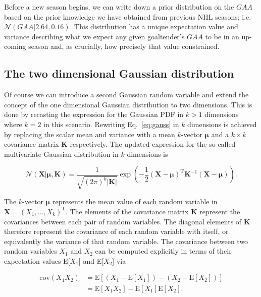 Before a new season begins, we can write down a prior distribution on the $GAA$
based on the prior knowledge we have obtained from previous NHL seasons; i.e.
$\mathcal{N}(GAA|2.64,0.16)$. This distribution has a unique expectation value and
variance describing what we expect any given goaltender's $GAA$ to be in an
up-coming season and, as crucially, how precisely that value constrained.

\subsection{The two dimensional Gaussian distribution}
Of course we can introduce a second Gaussian random variable and extend the 
concept of the one dimensional Gaussian distribution to two dimensions. This is done
by recasting the expression for the Gaussian PDF in $k>1$
dimensions where $k=2$ in this scenario. Rewriting Eq.~\ref{eq:gauss} in $k$
dimensions is achieved by replacing the scalar mean and variance with a mean
$k$-vector $\boldsymbol{\mu}$ and a $k \times k$ covariance matrix $\mathbf{K}$
respectively. The updated expression for the so-called multivariate Gaussian
distribution in $k$ dimensions is

\begin{equation}
  \mathcal{N}(\mathbf{X}|\boldsymbol{\mu},\mathbf{K}) = \frac{1}{\sqrt{(2\pi)^k
      |\mathbf{K}|}} \exp{\left( -\frac{1}{2} (\mathbf{X} -
    \boldsymbol{\mu})^{\text{T}} \mathbf{K}^{-1} (\mathbf{X}-\boldsymbol{\mu})
    \right)}.
  \label{eq:gauss2d}
\end{equation}

\noindent The $k$-vector $\boldsymbol{\mu}$ represents the mean value of each
random variable in $\mathbf{X}=(X_1,\dots,X_k)^{\text{T}}$.
The elements of the covariance matrix
$\mathbf{K}$ represent the covariances between each pair of random variables.
The diagonal elements of $\mathbf{K}$ therefore represent the covariance of each
random variable with itself, or equivalently the variance of that random variable.
The covariance between two random variables $X_1$ and $X_2$ can be computed explicitly
in terms of their expectation values E[$X_1$] and E[$X_2$] via

\begin{align}
  \text{cov}(X_1X_2) &= \text{E}[(X_1-\text{E}[X_1]) - (X_2-\text{E}[X_2])] \\
  &= \text{E}[X_1X_2] - \text{E}[X_1]\text{E}[X_2].
  \label{eq:coveq}
\end{align}

